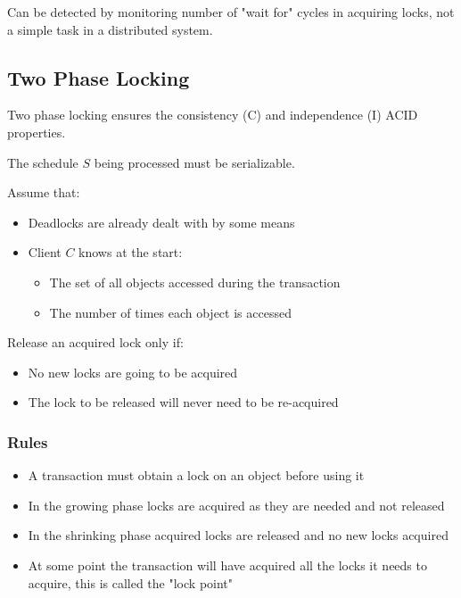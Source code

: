 \documentclass[a4paper]{article}
\begin{document}
Can be detected by monitoring number of "wait for" cycles in acquiring locks,
not a simple task in a distributed system.

\subsection{Two Phase Locking}

Two phase locking ensures the consistency (C) and independence (I) ACID
properties.

The schedule $S$ being processed must be serializable.

Assume that:

\begin{itemize}
  \item Deadlocks are already dealt with by some means
  \item Client $C$ knows at the start:
    \begin{itemize}
      \item The set of all objects accessed during the transaction
      \item The number of times each object is accessed
    \end{itemize}
\end{itemize}

Release an acquired lock only if:

\begin{itemize}
  \item No new locks are going to be acquired
  \item The lock to be released will never need to be re-acquired
\end{itemize}

\subsubsection{Rules}

\begin{itemize}
  \item A transaction must obtain a lock on an object before using it
  \item In the growing phase locks are acquired as they are needed and not
        released
  \item In the shrinking phase acquired locks are released and no new locks
        acquired
  \item At some point the transaction will have acquired all the locks it needs
        to acquire, this is called the "lock point"
\end{itemize}
\end{document}

